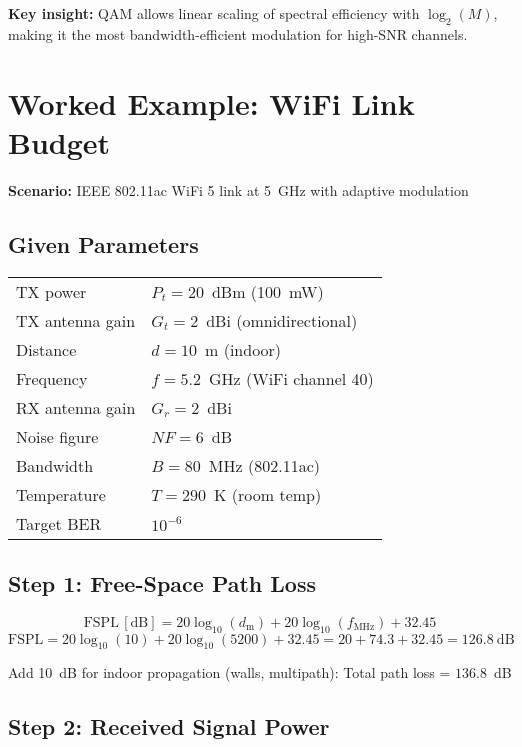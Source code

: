 \textbf{Key insight:} QAM allows linear scaling of spectral efficiency with $\log_2(M)$, making it the most bandwidth-efficient modulation for high-SNR channels.

\section{Worked Example: WiFi Link Budget}

\textbf{Scenario:} IEEE 802.11ac WiFi 5 link at 5~GHz with adaptive modulation

\subsection*{Given Parameters}

\begin{tabular}{@{}ll@{}}
TX power & $P_t = 20$~dBm (100~mW) \\
TX antenna gain & $G_t = 2$~dBi (omnidirectional) \\
Distance & $d = 10$~m (indoor) \\
Frequency & $f = 5.2$~GHz (WiFi channel 40) \\
RX antenna gain & $G_r = 2$~dBi \\
Noise figure & $NF = 6$~dB \\
Bandwidth & $B = 80$~MHz (802.11ac) \\
Temperature & $T = 290$~K (room temp) \\
Target BER & $10^{-6}$ \\
\end{tabular}

\subsection*{Step 1: Free-Space Path Loss}

\begin{equation}
\mathrm{FSPL\,[dB]} = 20\log_{10}(d_{\text{m}}) + 20\log_{10}(f_{\text{MHz}}) + 32.45
\end{equation}
\begin{equation}
\mathrm{FSPL} = 20\log_{10}(10) + 20\log_{10}(5200) + 32.45 = 20 + 74.3 + 32.45 = 126.8~\text{dB}
\end{equation}

Add 10~dB for indoor propagation (walls, multipath): Total path loss = $136.8$~dB

\subsection*{Step 2: Received Signal Power}

